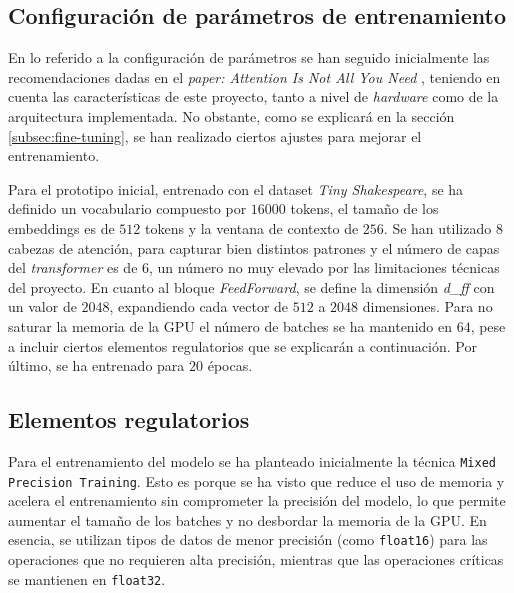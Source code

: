 \documentclass[11pt]{book}
\begin{document}
\subsection{Configuración de parámetros de entrenamiento}

En lo referido a la configuración de parámetros se han seguido inicialmente las recomendaciones dadas en el \textit{paper: Attention Is Not All You Need} \parencite{gerber2025ffn}, teniendo en cuenta las características de este proyecto, tanto a nivel de \textit{hardware} como de la arquitectura implementada. No obstante, como se explicará en la sección \ref{subsec:fine-tuning}, se han realizado ciertos ajustes para mejorar el entrenamiento.

Para el prototipo inicial, entrenado con el dataset \textit{Tiny Shakespeare}, se ha definido un vocabulario compuesto por $16000$ tokens, el tamaño de los embeddings es de $512$ tokens y la ventana de contexto de $256$. Se han utilizado $8$ cabezas de atención, para capturar bien distintos patrones y el número de capas del \textit{transformer} es de $6$, un número no muy elevado por las limitaciones técnicas del proyecto. En cuanto al bloque \textit{FeedForward}, se define la dimensión \textit{d\_ff} con un valor de $2048$, expandiendo cada vector de $512$ a $2048$ dimensiones. Para no saturar la memoria de la GPU el número de batches se ha mantenido en $64$, pese a incluir ciertos elementos regulatorios que se explicarán a continuación. Por último, se ha entrenado para $20$ épocas.


\subsection{Elementos regulatorios}

Para el entrenamiento del modelo se ha planteado inicialmente la técnica \texttt{Mixed Precision Training}. Esto es porque se ha visto que reduce el uso de memoria y acelera el entrenamiento sin comprometer la precisión del modelo, lo que permite aumentar el tamaño de los batches y no desbordar la memoria de la GPU. En esencia, se utilizan tipos de datos de menor precisión (como \texttt{float16}) para las operaciones que no requieren alta precisión, mientras que las operaciones críticas se mantienen en \texttt{float32}. 
\end{document}
